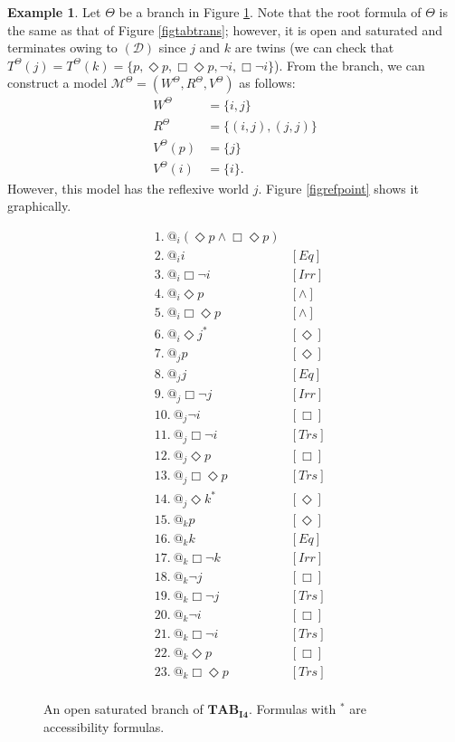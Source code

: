 \documentclass{article}
\theoremstyle{definition}
\newtheorem{example}[definition]{Example}
\newcommand{\Dia}{\Diamond}
\newcommand{\Kmodel}{\mathcal{M}}
\newcommand{\Drest}{(\mathcal{D})}
\newcommand{\irr}{\mathit{Irr}}
\newcommand{\trans}{\mathit{Trs}}
\newcommand{\reflexivity}{\mathit{Eq}}
\newcommand{\tableauIF}{\mathbf{TAB}_{\mathbf{I4}}}
\begin{document}
\begin{example}
    Let $\Theta$ be a branch in Figure \ref{figtabsaturated}. Note that the root formula of $\Theta$ is the same as that of Figure \ref{figtabtrans}; however, it is open and saturated and terminates owing to $\Drest$ since $j$ and $k$ are twins (we can check that $T^\Theta(j) = T^\Theta(k) = \{ p, \Dia p, \Box \Dia p, \neg i, \Box \neg i \}$). From the branch, we can construct a model $\Kmodel^\Theta = (W^\Theta, R^\Theta, V^\Theta)$ as follows:
    \begin{align*}
        W^\Theta &= \{ i, j \} \\
        R^\Theta &= \{ (i, j), (j, j) \} \\
        V^\Theta(p) &= \{ j \} \\
        V^\Theta(i) &= \{ i \}.
    \end{align*}
    However, this model has the reflexive world $j$. Figure \ref{figrefpoint} shows it graphically.
    \begin{figure}[tbp]
      \begin{align*}
        &1. \ @_i (\Dia p \land \Box \Dia p) & \\
        &2. \ @_i i &[\reflexivity] \\
        &3. \ @_i \Box \neg i &[\irr] \\
        &4. \ @_i \Dia p &[\land] \\
        &5. \ @_i \Box \Dia p &[\land] \\
        &6. \ {@_i \Dia j}^* &[\Dia] \\
        &7. \ @_j p &[\Dia] \\
        &8. \ @_j j &[\reflexivity] \\
        &9. \ @_j \Box \neg j &[\irr] \\
        &10. \ @_j \neg i &[\Box] \\
        &11. \ @_j \Box \neg i &[\trans] \\
        &12. \ @_j \Dia p &[\Box] \\
        &13. \ @_j \Box \Dia p &[\trans] \\
        &14. \ {@_j \Dia k}^* &[\Dia] \\
        &15. \ @_k p &[\Dia] \\ 
        &16. \ @_k k &[\reflexivity] \\
        &17. \ @_k \Box \neg k &[\irr] \\
        &18. \ @_k \neg j &[\Box] \\
        &19. \ @_k \Box \neg j &[\trans] \\
        &20. \ @_k \neg i &[\Box] \\
        &21. \ @_k \Box \neg i &[\trans] \\
        &22. \ @_k \Dia p &[\Box] \\
        &23. \ @_k \Box \Dia p &[\trans] \\
      \end{align*}
      \caption{An open saturated branch of $\tableauIF$. Formulas with ${}^*$ are accessibility formulas.}
      \label{figtabsaturated}
    \end{figure}
    

\end{example}
\end{document}
